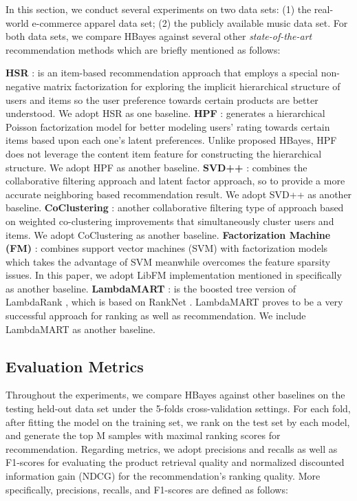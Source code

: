 In this section, we conduct several experiments on two data sets: (1) the real-world e-commerce apparel data set; (2) the publicly available music data set.  For both data sets, we compare HBayes against several other \emph{state-of-the-art} recommendation methods which are briefly mentioned as follows:

{\noindent\textbf{HSR} \cite{wang2015exploring}: is an item-based recommendation approach that employs a special non-negative matrix factorization for exploring the implicit hierarchical structure of users and items so the user preference towards certain products are better understood.  We adopt HSR  as one baseline. \newline
\textbf{HPF} \cite{gopalan2015scalable}: generates a hierarchical Poisson factorization model for better modeling users' rating towards certain items based upon each one's latent preferences.  Unlike proposed HBayes, HPF does not leverage the content item feature for constructing the hierarchical structure. We adopt HPF as another baseline. \newline
\textbf{SVD++} \cite{mnih2008probabilistic, koren2008factorization}: combines the collaborative filtering approach and latent factor approach, so to provide a more accurate neighboring based recommendation result.  We adopt SVD++ as another baseline. \newline
\textbf{CoClustering} \cite{george2005scalable}: another collaborative filtering type of approach based on weighted co-clustering improvements that simultaneously cluster users and items.  We adopt CoClustering as another baseline. \newline
\textbf{Factorization Machine (FM)} \cite{rendle2010factorization,rendle2012factorization}: combines support vector machines (SVM) with factorization models which takes the advantage of SVM meanwhile overcomes the feature sparsity issues.  In this paper, we adopt LibFM implementation mentioned in \cite{rendle2012factorization} specifically as another baseline. \newline
\textbf{LambdaMART} \cite{burges2010ranknet}: is the boosted tree version of LambdaRank \cite{donmez2009local}, which is based on RankNet \cite{burges2005learning}.  LambdaMART proves to be a very successful approach for ranking as well as recommendation.  We include LambdaMART as another baseline. \newline}

\subsection{Evaluation Metrics}
Throughout the experiments, we compare HBayes against other baselines on the testing held-out data set under the 5-folds cross-validation settings.  For each fold, after fitting the model on the training set, we rank on the test set by each model, and generate the top M samples with maximal ranking scores for recommendation.  Regarding metrics, we adopt precisions and recalls as well as F1-scores for evaluating the product retrieval quality and normalized discounted information gain (NDCG) for the recommendation's ranking quality.  More specifically, precisions, recalls, and F1-scores are defined as follows:

